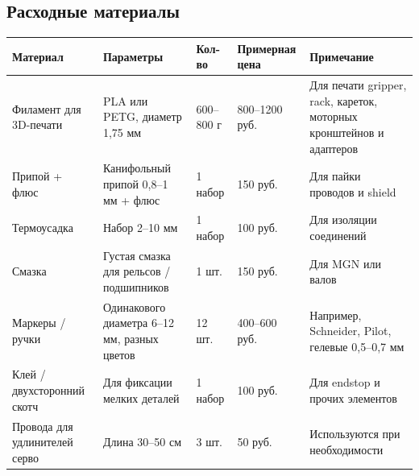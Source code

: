 \documentclass[a4paper,12pt]{article}
\begin{document}
\subsection*{Расходные материалы}

\begin{table}[H]
\centering
\small
\begin{tabularx}{\textwidth}{|p{3.3cm}|Y|p{1.8cm}|p{2.2cm}|Y|}
\hline
\textbf{Материал} & \textbf{Параметры} & \textbf{Кол-во} & \textbf{Примерная цена} & \textbf{Примечание} \\
\hline
Филамент для 3D-печати & PLA или PETG, диаметр 1{,}75 мм & 600--800 г & 800--1200 руб. & Для печати gripper, rack, кареток, моторных кронштейнов и адаптеров \\
\hline
Припой + флюс & Канифольный припой 0{,}8--1 мм + флюс & 1 набор & 150 руб. & Для пайки проводов и shield \\
\hline
Термоусадка & Набор 2--10 мм & 1 набор & 100 руб. & Для изоляции соединений \\
\hline
Смазка & Густая смазка для рельсов / подшипников & 1 шт. & 150 руб. & Для MGN или валов \\
\hline
Маркеры / ручки & Одинакового диаметра 6--12 мм, разных цветов & 12 шт. & 400--600 руб. & Например, Schneider, Pilot, гелевые 0{,}5--0{,}7 мм \\
\hline
Клей / двухсторонний скотч & Для фиксации мелких деталей & 1 набор & 100 руб. & Для endstop и прочих элементов \\
\hline
Провода для удлинителей серво & Длина 30--50 см & 3 шт. & 50 руб. & Используются при необходимости \\
\hline
\end{tabularx}
\end{table}
\end{document}
